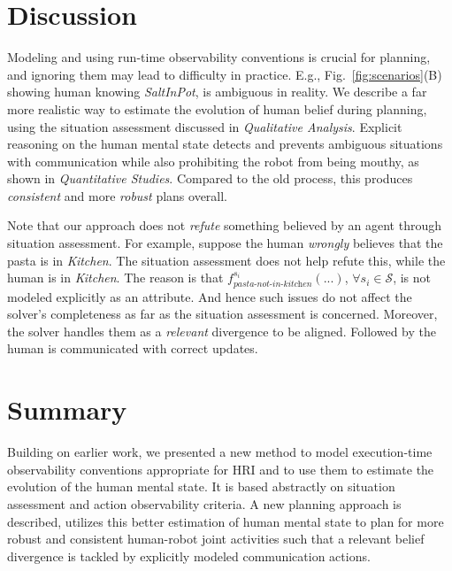 \documentclass[letterpaper]{article} %
\begin{document}
\section{Discussion}
Modeling and using run-time observability conventions is crucial for planning, and ignoring them may lead to difficulty in practice. 
E.g., Fig.~\ref{fig:scenarios}(B) showing human knowing \textit{SaltInPot}, is ambiguous in reality. We describe a far more realistic way to estimate the evolution of human belief during planning, using the situation assessment discussed in \textit{Qualitative Analysis}. Explicit reasoning on the human mental state detects and prevents ambiguous situations with communication while also prohibiting the robot from being mouthy, as shown in \textit{Quantitative Studies}. 
Compared to the old process, this produces \textit{consistent} and more \textit{robust} plans overall.

Note that our approach does not \textit{refute} something believed by an agent through situation assessment. 
For example, suppose the human 
\textit{wrongly} believes that the pasta is in \textit{Kitchen}. The situation assessment does not help refute this, while the human is in \textit{Kitchen}. 
The reason is that $f_{\textit{pasta-not-in-kitchen}}^{s_i}(...)$, $\forall s_i \in \mathcal{S}$, is not modeled explicitly as an attribute. 
And hence such issues do not affect the solver's completeness as far as the situation assessment is concerned. Moreover, the solver handles them as a \textit{relevant} divergence to be aligned. Followed by the human is communicated with correct updates.

\section{Summary} 
Building on earlier work, we presented a new method to model execution-time observability conventions appropriate for HRI and to use them to estimate the evolution of the human mental state. It is based abstractly on situation assessment and action observability criteria. 
A new planning approach is described, utilizes this better estimation of human mental state to plan for more robust and consistent human-robot joint activities such that a relevant belief divergence is tackled by explicitly modeled communication actions. 
\end{document}
